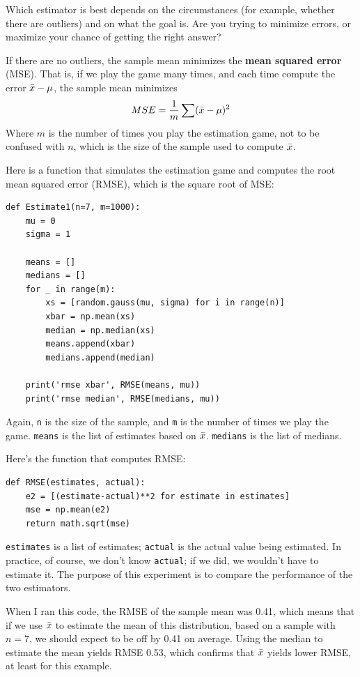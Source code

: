 \documentclass[12pt]{book}
\begin{document}
Which estimator is best depends on the circumstances (for example,
whether there are outliers) and on what the goal is.  Are you
trying to minimize errors, or maximize your chance of getting the
right answer?

If there are no outliers, the sample mean minimizes the {\bf mean squared
error} (MSE).  That is, if we play the game many times, and each time
compute the error $\bar{x} - \mu$, the sample mean minimizes
%
\[ MSE = \frac{1}{m} \sum (\bar{x} - \mu)^2 \]
%
Where $m$ is the number of times you play the estimation game, not
to be confused with $n$, which is the size of the sample used to
compute $\bar{x}$.

Here is a function that simulates the estimation game and computes
the root mean squared error (RMSE), which is the square root of
MSE:

\begin{verbatim}
def Estimate1(n=7, m=1000):
    mu = 0
    sigma = 1

    means = []
    medians = []
    for _ in range(m):
        xs = [random.gauss(mu, sigma) for i in range(n)]
        xbar = np.mean(xs)
        median = np.median(xs)
        means.append(xbar)
        medians.append(median)

    print('rmse xbar', RMSE(means, mu))
    print('rmse median', RMSE(medians, mu))
\end{verbatim}

Again, {\tt n} is the size of the sample, and {\tt m} is the
number of times we play the game.  {\tt means} is the list of
estimates based on $\bar{x}$.  {\tt medians} is the list of medians.

Here's the function that computes RMSE:

\begin{verbatim}
def RMSE(estimates, actual):
    e2 = [(estimate-actual)**2 for estimate in estimates]
    mse = np.mean(e2)
    return math.sqrt(mse)
\end{verbatim}

{\tt estimates} is a list of estimates; {\tt actual} is the
actual value being estimated.  In practice, of course, we don't
know {\tt actual}; if we did, we wouldn't have to estimate it.
The purpose of this experiment is to compare the performance of
the two estimators.

When I ran this code, the RMSE of the sample mean was 0.41, which
means that if we use $\bar{x}$ to estimate the mean of this
distribution, based on a sample with $n=7$, we should expect to be off
by 0.41 on average.  Using the median to estimate the mean yields
RMSE 0.53, which confirms that $\bar{x}$ yields lower RMSE, at least
for this example.
\end{document}
